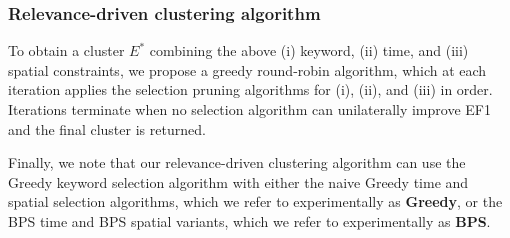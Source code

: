 \subsubsection{Relevance-driven clustering algorithm}
\label{sec:relclustering}

To obtain a cluster $E^*$ combining the above (i) keyword, (ii) time, and (iii) spatial constraints, we propose a greedy round-robin algorithm, which at each iteration applies the selection pruning algorithms for (i), (ii), and (iii) in order.  Iterations terminate when no selection algorithm can unilaterally improve EF1 and the final cluster is returned.



Finally, we note that our relevance-driven clustering algorithm can use the Greedy keyword selection algorithm with either the naive Greedy time and spatial selection algorithms, which we refer to experimentally as {\bf Greedy}, or the BPS time and BPS spatial variants, which we refer to experimentally as {\bf BPS}.  



